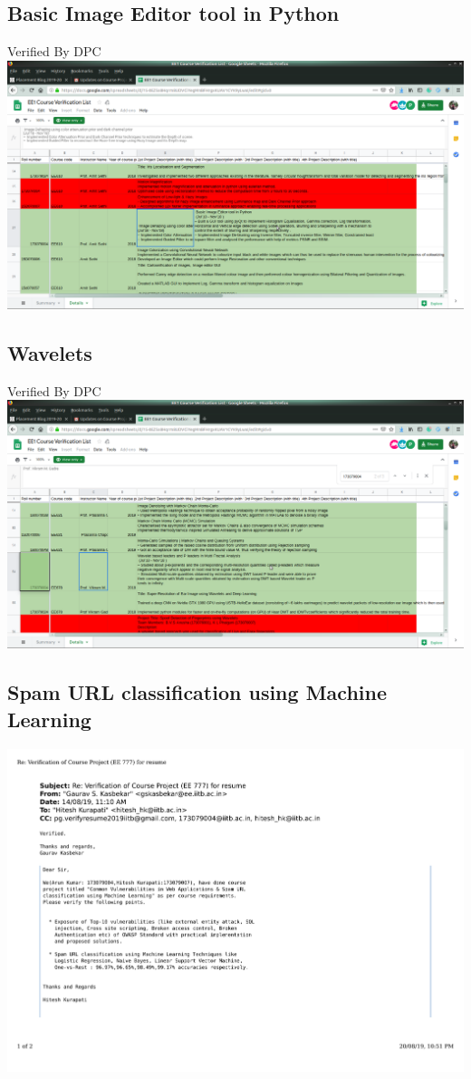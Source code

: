 \documentclass{article}
\begin{document}
	\subsection{Basic Image Editor tool in Python}
		Verified By DPC\\
		\includegraphics[page=1, scale=0.25]{proofs/image_processing.png}
	\subsection{Wavelets}
		Verified By DPC\\
		\includegraphics[page=1, scale=0.25]{proofs/wavelets.png}
	\subsection{ Spam URL classification using Machine Learning}
		\includegraphics[page=1, scale=0.5]{proofs/spam_url.pdf}\\
\end{document}

